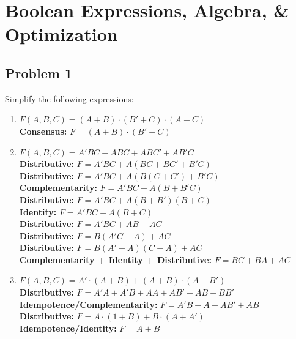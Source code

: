 \documentclass{article}
\begin{document}
\newpage
\section*{Boolean Expressions, Algebra, \& Optimization}
\subsection*{Problem 1}
Simplify the following expressions:
\begin{enumerate}[label=\alph*.]
    \item $ F(A,B,C) = (A + B) \cdot (B' + C) 
    \cdot (A + C)$ \\
\textbf{Consensus:} $F=(A+B)\cdot(B'+C)$ \\

    \item $ F(A,B,C) = A'BC + ABC + ABC' + AB'C$ \\
\textbf{Distributive:} $F=A'BC+A(BC+BC'+B'C)$ \\
\textbf{Distributive:} $F=A'BC+A(B(C+C')+B'C)$ \\
\textbf{Complementarity:} $F=A'BC+A(B+B'C)$ \\
\textbf{Distributive:} $F=A'BC+A(B+B')(B+C)$ \\
\textbf{Identity:} $F=A'BC+A(B+C)$ \\
\textbf{Distributive:} $F=A'BC+AB+AC$ \\
\textbf{Distributive:} $F=B(A'C+A)+AC$ \\
\textbf{Distributive:} $F=B(A'+A)(C+A)+AC$ \\
\textbf{Complementarity + Identity + Distributive:} $F=BC+BA+AC$ \\
    
    \item $ F(A,B,C) = A' \cdot (A + B) + (A + B) \cdot (A + B')$ \\
\textbf{Distributive:} $F=A'A+A'B+AA+AB'+AB+BB'$ \\
\textbf{Idempotence/Complementarity:} $F=A'B+A+AB'+AB$ \\
\textbf{Distributive:} $F=A\cdot(1+B) + B\cdot(A+A')$ \\
\textbf{Idempotence/Identity:} $F=A+B$ \\
\end{enumerate}
\end{document}
